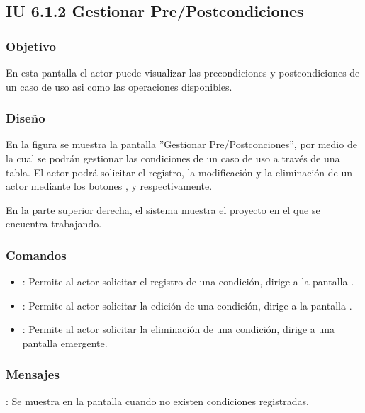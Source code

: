 \subsection{IU 6.1.2 Gestionar Pre/Postcondiciones}

\subsubsection{Objetivo}
	En esta pantalla el actor puede visualizar las precondiciones y postcondiciones de un caso de uso asi como las operaciones disponibles.
\subsubsection{Diseño}
	En la figura  se muestra la pantalla ''Gestionar Pre/Postconciones'', por medio de la cual se podrán gestionar las condiciones de un caso de uso a través de una tabla. El actor podrá solicitar el registro, la modificación y la eliminación de un actor mediante los botones , \editar y \eliminar respectivamente.
	
	En la parte superior derecha, el sistema muestra el proyecto en el que se encuentra trabajando.

\subsubsection{Comandos}
\begin{itemize}
	\item {}: Permite al actor solicitar el registro de una condición, dirige a la pantalla .
	\item \editar [Modificar]: Permite al actor solicitar la edición de una condición, dirige a la pantalla .
	\item \eliminar [Eliminar]: Permite al actor solicitar la eliminación de una condición, dirige a una pantalla emergente.
\end{itemize}
\subsubsection{Mensajes}

\begin{Citemize}
	\item {}: Se muestra en la pantalla  cuando no existen condiciones registradas.
\end{Citemize}

